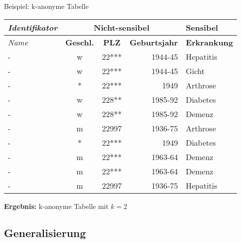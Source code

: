 \begin{frame}{Beispiel: k-anonyme Tabelle}
	\begin{center}
			\begin{tabular}{|l|c|c|r|l|}
		\hline \textit{Identifikator} & \multicolumn{3}{c|}{\textbf{Nicht-sensibel}} & \textbf{Sensibel} \\ 
		\hline \textit{Name} & \textbf{Geschl.} & \textbf{PLZ} & \textbf{Geburtsjahr} & \textbf{Erkrankung} \\ \hline
		\hline \rowcolor{svshellblau1!30} 	- & w & 22*** & 1944-45 & Hepatitis \\ 
		\hline \rowcolor{svshellblau1!30}	- & w & 22*** & 1944-45 & Gicht \\ 
		\hline \rowcolor{svsgrau1!30} 		- & * & 22*** & 1949 & Arthrose \\ 
		\hline \rowcolor{svshellblau2!30} 	- & w & 228** & 1985-92 & Diabetes \\
		\hline \rowcolor{svshellblau2!30} 	- & w & 228** & 1985-92 & Demenz \\  
		\hline \rowcolor{white} 			- & m & 22997 & 1936-75 & Arthrose \\ 
		\hline \rowcolor{svsgrau1!30} 		- & * & 22*** & 1949 & Diabetes \\ 
		\hline \rowcolor{svsrot!30} 		- & m & 22*** & 1963-64 & Demenz \\ 
		\hline \rowcolor{svsrot!30} 		- & m & 22*** & 1963-64 & Demenz \\ 
		\hline \rowcolor{white} 			- & m & 22997 & 1936-75 & Hepatitis \\ 
		\hline 
		\end{tabular}
		\vspace{0.5cm}
		\pause

		\textbf{Ergebnis: }k-anonyme Tabelle mit \(k=2\)
	\end{center}
\end{frame}


\subsection{Generalisierung}


